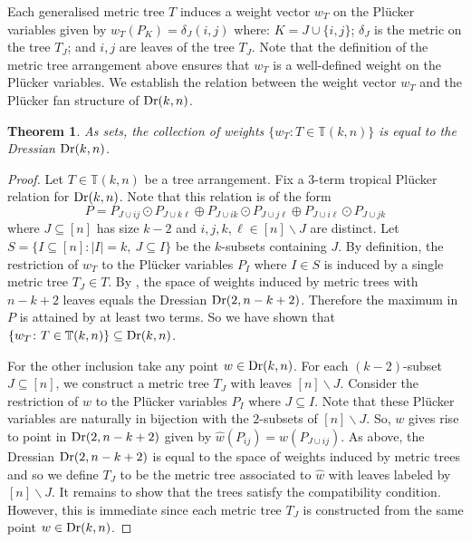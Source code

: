 \documentclass[10pt,a4paper]{amsart}
\newcommand{\TT}{\mathbb{T}}
\DeclareMathOperator{\Dr}{\rm Dr}
\theoremstyle{plain}
\newtheorem{theorem}{Theorem}
\theoremstyle{definition}
\numberwithin{subcase}{case}
\begin{document}
Each generalised metric tree $T$ induces a weight vector $w_T$ on the Pl\"ucker variables given by $w_T(P_K) = \delta_J(i,j)$ where: $K = J \cup \{i,j\}$; $\delta_J$ is the metric on the tree $T_J$; and $i,j$ are leaves of the tree $T_J$. Note that the definition of the metric tree arrangement above ensures that $w_T$ is a well-defined weight on the Pl\"ucker variables. We establish the relation between the weight vector $w_{T}$ and the Pl\"ucker fan structure of $\Dr(k,n)$.

\setcounter{theorem}{22}
\begin{theorem}\label{prop:gen_tree_dressian}
As sets, the collection of weights $\{w_T \colon T \in \TT(k,n) \}$ is equal to the Dressian $\Dr(k,n)$.
\end{theorem}

\begin{proof}
Let $T \in \TT(k,n)$ be a tree arrangement. Fix a $3$-term tropical Pl\"ucker relation for $\Dr(k,n)$. Note that this relation is of the form
\[
P = 
P_{J \cup ij} \odot P_{J \cup k\ell} \oplus
P_{J \cup ik} \odot P_{J \cup j\ell} \oplus
P_{J \cup i\ell} \odot P_{J \cup jk} 
\]
where $J \subseteq [n]$ has size $k - 2$ and $i,j,k,\ell \in [n] \backslash J$ are distinct. Let $S = \{I \subseteq [n] \colon |I| = k, \ J \subseteq I \}$ be the $k$-subsets containing $J$. By definition, the restriction of $w_T$ to the Pl\"ucker variables $P_I$ where $I \in S$ is induced by a single metric tree $T_J \in T$. By \cite{speyer2004tropical}, the space of weights induced by metric trees with $n-k+2$ leaves equals the Dressian $\Dr(2, n-k+2)$. Therefore the maximum in $P$ is attained by at least two terms. So we have shown that $\{w_T \colon T \in \TT(k,n) \} \subseteq \Dr(k,n)$.

For the other inclusion take any point $w \in \Dr(k,n)$. For each $(k-2)$-subset $J \subseteq [n]$, we construct a metric tree $T_J$ with leaves $[n]\backslash J$. Consider the restriction of $w$ to the Pl\"ucker variables $P_I$ where $J \subseteq I$. Note that these Pl\"ucker variables are naturally in bijection with the $2$-subsets of $[n]\backslash J$. So, $w$ gives rise to point in $\Dr(2, n-k+2)$ given by $\hat w(P_{ij}) = w(P_{J \cup ij})$. As above, the Dressian $\Dr(2, n-k+2)$ is equal to the space of weights induced by metric trees and so we define $T_J$ to be the metric tree associated to $\hat w$ with leaves labeled by $[n] \backslash J$. It remains to show that the trees satisfy the compatibility condition. However, this is immediate since each metric tree $T_J$ is constructed from the same point $w \in \Dr(k,n)$.
\end{proof}
\end{document}
